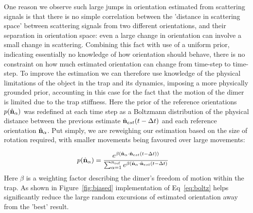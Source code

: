 One reason we observe such large jumps in orientation estimated from scattering signals is that there is no simple correlation between the 'distance in scattering space' between scattering signals from two different orientations, and their separation in orientation space: even a large change in orientation can involve a small change in scattering. Combining this fact with use of a uniform prior, indicating essentially no knowledge of how orientation should behave, there is no constraint on how much estimated orientation can change from time-step to time-step. To improve the estimation we can therefore use knowledge of the physical limitations of the object in the trap and its dynamics, imposing a more physically grounded prior, accounting in this case for the fact that the motion of the dimer is limited due to the trap stiffness. Here the prior of the reference orientations $p(\hat{\bf n}_\alpha)$ was redefined at each time step as a Boltzmann distribution of the physical distance between the previous estimate $\hat{\bf n}_{est}(t-\Delta t)$ and each reference orientation $\hat{\bf n}_\alpha$. Put simply, we are reweighing our estimation based on the size of rotation required, with smaller movements being favoured over large movements:

\begin{align}
	p(\hat{\bf n}_\alpha)
	&=\frac{e^{\beta (\hat{\bf n}_\alpha 
			\cdot \hat{\bf n}_{est}(t-\Delta t))}}
	{\sum_{\alpha=1}^{n_{\rm ref}}
		e^{\beta (\hat{\bf n}_\alpha 
			\cdot \hat{\bf n}_{est}(t-\Delta t)}}
	\label{eq:boltz}
\end{align}
Here $\beta$ is a weighting factor describing the dimer's freedom of motion within the trap. As shown in Figure~\ref{fig:biased} implementation of Eq~\eqref{eq:boltz} helps significantly reduce the large random excursions of estimated orientation away from the 'best' result. 

